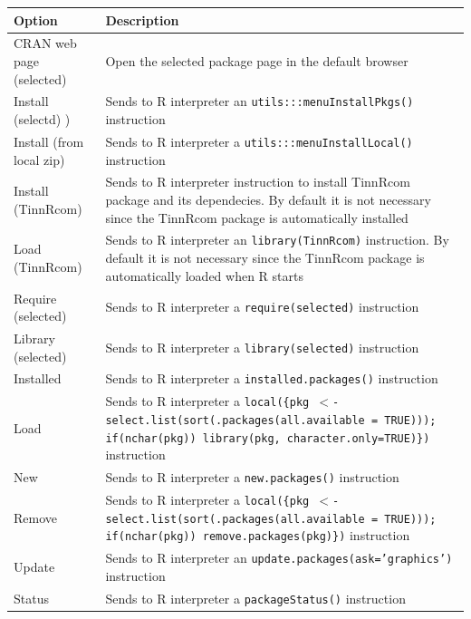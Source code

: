 \begin{scriptsize}
  \begin{tabularx}{\headwidth}{>{\hsize=0.2\hsize}X>{\hsize=0.7\hsize}X}\\
    \hline
    \textbf{Option} & \textbf{Description} \\
    \hline
    CRAN web page (selected) & Open the selected package page in the default browser \\
    \hdashline[1pt/1pt]
    Install (selectd) )& Sends to R interpreter an \texttt{utils:::menuInstallPkgs()} instruction \\
    Install (from local zip) & Sends to R interpreter a \texttt{utils:::menuInstallLocal()} instruction \\
    \hdashline[1pt/1pt]
    Install (TinnRcom) & Sends to R interpreter instruction to install TinnRcom package and its dependecies.
     By default it is not necessary since the TinnRcom package is automatically installed \\
    Load (TinnRcom) & Sends to R interpreter an \texttt{library(TinnRcom)} instruction.
      By default it is not necessary since the TinnRcom package is automatically loaded when R starts \\
    \hdashline[1pt/1pt]
    Require (selected) & Sends to R interpreter a \texttt{require(selected)} instruction \\
    Library (selected) & Sends to R interpreter a \texttt{library(selected)} instruction \\
    \hdashline[1pt/1pt]
    Installed & Sends to R interpreter a \texttt{installed.packages()} instruction \\
    Load & Sends to R interpreter a \texttt{local(\{pkg $<$- select.list(sort(.packages(all.available = TRUE)));
     if(nchar(pkg)) library(pkg, character.only=TRUE)\})} instruction \\
    New & Sends to R interpreter a \texttt{new.packages()} instruction \\
    Remove & Sends to R interpreter a \texttt{local(\{pkg $<$- select.list(sort(.packages(all.available = TRUE)));
     if(nchar(pkg)) remove.packages(pkg)\})} instruction \\
    Update & Sends to R interpreter an \texttt{update.packages(ask='graphics')} instruction \\
    Status & Sends to R interpreter a \texttt{packageStatus()} instruction \\
    \hline
  \end{tabularx}
\end{scriptsize}

